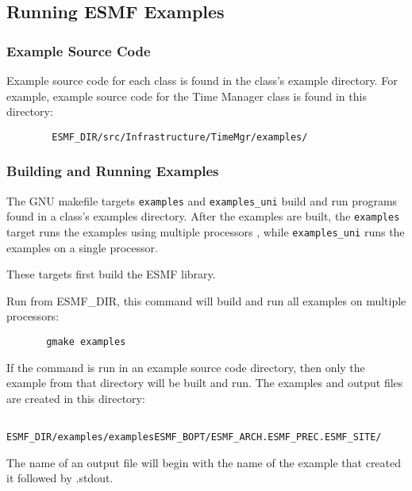 
\subsection{Running ESMF Examples}
\label{examples}


\subsubsection{Example Source Code}

Example source code for each class is found in the class's example
directory. For example, example source code for the Time Manager class
is found in this directory:

\begin{verbatim}
        ESMF_DIR/src/Infrastructure/TimeMgr/examples/
\end{verbatim}


\subsubsection{Building and Running Examples}

The GNU makefile targets {\tt examples} and {\tt examples\_uni} build
and run programs found in a class's examples directory.  After the
examples are built, the {\tt examples} target runs the examples using
multiple processors , while {\tt examples\_uni} runs the examples on
a single processor.

These targets first build the ESMF library.

Run from ESMF\_DIR, this command will build and run all examples on
multiple processors:

\begin{verbatim}
       gmake examples
\end{verbatim}

If the command is run in an example source code directory, then only
the example from that directory will be built and run.  The examples
and output files are created in this directory:

\begin{verbatim}
       ESMF_DIR/examples/examplesESMF_BOPT/ESMF_ARCH.ESMF_PREC.ESMF_SITE/
\end{verbatim}

The name of an output file will begin with the name of the example
that created it followed by .stdout.
